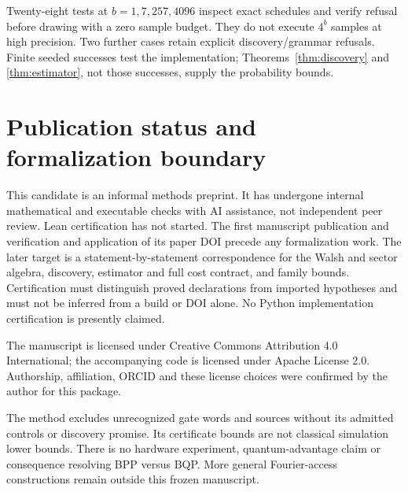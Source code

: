 \documentclass[11pt]{article}
\begin{document}
Twenty-eight tests at $b=1,7,257,4096$ inspect exact schedules and verify refusal
before drawing with a zero sample budget. They do not execute $4^b$ samples at high
precision. Two further cases retain explicit discovery/grammar refusals. Finite
seeded successes test the implementation; Theorems~\ref{thm:discovery} and
\ref{thm:estimator}, not those successes, supply the probability bounds.

\section{Publication status and formalization boundary}\label{sec:status}
This candidate is an informal methods preprint. It has undergone internal mathematical
and executable checks with AI assistance, not independent peer review. Lean
certification has not started. The first manuscript publication and verification and
application of its paper DOI precede any formalization work. The later target is a
statement-by-statement correspondence for the Walsh and sector algebra, discovery,
estimator and full cost contract, and family bounds. Certification must distinguish
proved declarations from imported hypotheses and must not be inferred from a build
or DOI alone. No Python implementation certification is presently claimed.

The manuscript is licensed under Creative Commons Attribution 4.0 International;
the accompanying code is licensed under Apache License 2.0. Authorship, affiliation,
ORCID and these license choices were confirmed by the author for this package.

The method excludes unrecognized gate words and sources without its admitted controls
or discovery promise. Its certificate bounds are not classical simulation lower
bounds. There is no hardware experiment, quantum-advantage claim or consequence
resolving BPP versus BQP. More general Fourier-access constructions remain outside
this frozen manuscript.

\appendix
\end{document}

